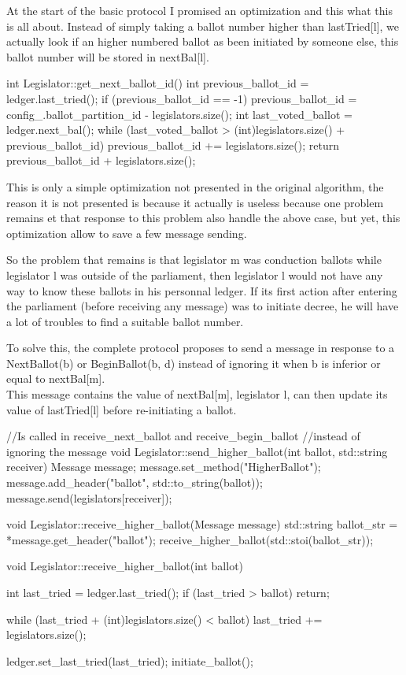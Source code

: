\documentclass{article}
\begin{document}
At the start of the basic protocol I promised an optimization and this what this is all about. Instead of simply taking a ballot number higher than lastTried[l], we actually look if an higher numbered ballot as been initiated by someone else, this ballot number will be stored in nextBal[l].
\begin{code}
int Legislator::get_next_ballot_id()
{
    int previous_ballot_id = ledger.last_tried();
    if (previous_ballot_id == -1)
        previous_ballot_id = config_.ballot_partition_id - legislators.size();
    int last_voted_ballot = ledger.next_bal();
    while (last_voted_ballot > (int)legislators.size() + previous_ballot_id)
        previous_ballot_id += legislators.size();
    return previous_ballot_id + legislators.size();
}
\end{code}

This is only a simple optimization not presented in the original algorithm, the reason it is not presented is because it actually is useless because one problem remains et that response to this problem also handle the above case, but yet, this optimization allow to save a few message sending.

    So the problem that remains is that legislator m was conduction ballots while legislator l was outside of the parliament, then legislator l would not have any way to know these ballots in his personnal ledger. If its first action after entering the parliament (before receiving any message) was to initiate decree, he will have a lot of troubles to find a suitable ballot number.

To solve this, the complete protocol proposes to send a message in response to a NextBallot(b) or BeginBallot(b, d) instead of ignoring it when b is inferior or equal to nextBal[m].\\
This message contains the value of nextBal[m], legislator l, can then update its value of lastTried[l] before re-initiating a ballot.

\begin{code}
//Is called in receive_next_ballot and receive_begin_ballot
//instead of ignoring the message
void Legislator::send_higher_ballot(int ballot, std::string receiver)
{
    Message message;
    message.set_method("HigherBallot");
    message.add_header("ballot", std::to_string(ballot));
    message.send(legislators[receiver]);
}

void Legislator::receive_higher_ballot(Message message)
{
    std::string ballot_str = *message.get_header("ballot");
    receive_higher_ballot(std::stoi(ballot_str));
}

void Legislator::receive_higher_ballot(int ballot)
{
    int last_tried = ledger.last_tried();
    if (last_tried > ballot)
        return;

    while (last_tried + (int)legislators.size() < ballot)
        last_tried += legislators.size();

    ledger.set_last_tried(last_tried);
    initiate_ballot();
}
\end{code}
\end{document}
